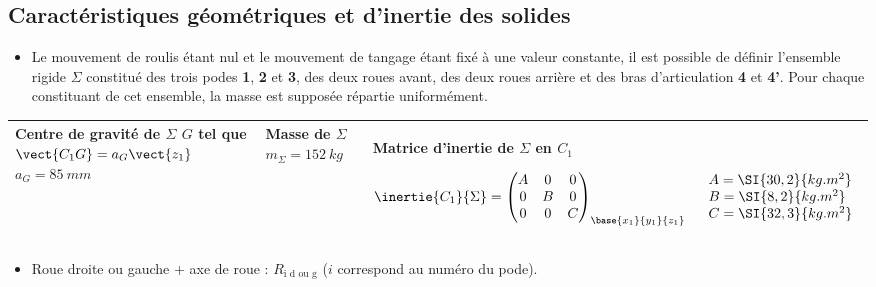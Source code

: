 \subsection*{Caractéristiques géométriques et d’inertie des solides}

\begin{itemize}
\item Le mouvement de roulis étant nul et le mouvement de tangage étant fixé à une valeur constante, il est possible de définir l’ensemble rigide $\Sigma$ constitué des trois podes \textbf{1}, \textbf{2} et \textbf{3}, des deux roues avant, des deux roues arrière et des bras d’articulation \textbf{4} et \textbf{4’}. Pour chaque constituant de cet ensemble, la masse est supposée répartie uniformément.
\end{itemize}

\begin{center}
\begin{tabular}{|p{4cm}|p{4cm}|p{8cm}|}
\hline
Centre de gravité de $\Sigma$ 
$G$ tel que $\vect{C_1G}=a_G\vect{z_1}$
$a_G =\SI{85}{mm}$
& 
Masse de $\Sigma$ $m_{\Sigma}=\SI{152}{kg}$
& 
Matrice d'inertie de $\Sigma$ en $C_1$ 

$\inertie{C_1}{\Sigma}=
\begin{pmatrix} 
A & 0 & 0 \\ 0 & B & 0 \\ 0 & 0 & C 
\end{pmatrix}_{\base{x_1}{y_1}{z_1}}
\quad 
\begin{array}{l}
A =\SI{30,2}{kg.m^2} \\
B =\SI{8,2}{kg.m^2} \\
C =\SI{32,3}{kg.m^2} \\
\end{array}$ \\
\hline
\end{tabular}
\end{center}


\begin{itemize}
\item Roue droite ou gauche + axe de roue : $R_{\text{i d ou g}}$ ($i$ correspond au numéro du pode).
\end{itemize}

